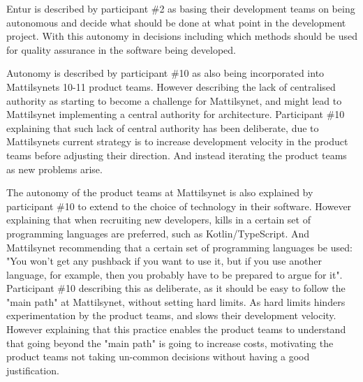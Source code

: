 Entur is described by participant \#2 as basing their development teams on being autonomous and decide what should be done at what point in the development project. With this autonomy in decisions including which methods should be used for quality assurance in the software being developed.


Autonomy is described by participant \#10 as also being incorporated into Mattilsynets 10-11 product teams. However describing the lack of centralised authority as starting to become a challenge for Mattilsynet, and might lead to Mattilsynet implementing a central authority for architecture. Participant \#10 explaining that such lack of central authority has been deliberate, due to Mattilsynets current strategy is to increase development velocity in the product teams before adjusting their direction. And instead iterating the product teams as new problems arise.


The autonomy of the product teams at Mattilsynet is also explained by participant \#10 to extend to the choice of technology in their software. However explaining that when recruiting new developers, kills in a certain set of programming languages are preferred, such as Kotlin/TypeScript. And Mattilsynet recommending that a certain set of programming languages be used: "You won't get any pushback if you want to use it, but if you use another language, for example, then you probably have to be prepared to argue for it". Participant \#10 describing this as deliberate, as it should be easy to follow the "main path" at Mattilsynet, without setting hard limits. As hard limits hinders experimentation by the product teams, and slows their development velocity. However explaining that this practice enables the product teams to understand that going beyond the "main path" is going to increase costs, motivating the product teams not taking un-common decisions without having a good justification.

